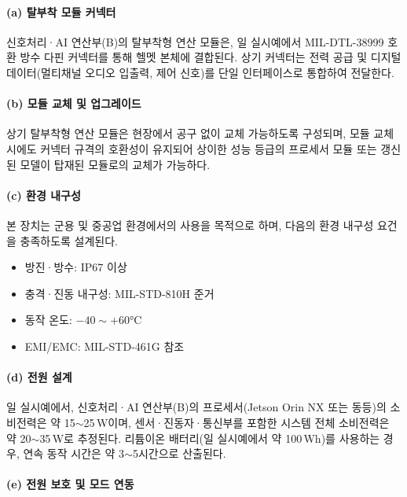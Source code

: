 \documentclass{article}
\begin{document}
\paragraph{(a) 탈부착 모듈 커넥터}

신호처리·AI 연산부(B)의 탈부착형 연산 모듈은, 일 실시예에서 MIL-DTL-38999 호환 방수 다핀 커넥터를 통해 헬멧 본체에 결합된다. 상기 커넥터는 전력 공급 및 디지털 데이터(멀티채널 오디오 입출력, 제어 신호)를 단일 인터페이스로 통합하여 전달한다.

\paragraph{(b) 모듈 교체 및 업그레이드}

상기 탈부착형 연산 모듈은 현장에서 공구 없이 교체 가능하도록 구성되며, 모듈 교체 시에도 커넥터 규격의 호환성이 유지되어 상이한 성능 등급의 프로세서 모듈 또는 갱신된 모델이 탑재된 모듈로의 교체가 가능하다.

\paragraph{(c) 환경 내구성}

본 장치는 군용 및 중공업 환경에서의 사용을 목적으로 하며, 다음의 환경 내구성 요건을 충족하도록 설계된다.

\begin{itemize}
    \item 방진·방수: IP67 이상
    \item 충격·진동 내구성: MIL-STD-810H 준거
    \item 동작 온도: $-40 \sim +60$°C
    \item EMI/EMC: MIL-STD-461G 참조
\end{itemize}

\paragraph{(d) 전원 설계}

일 실시예에서, 신호처리·AI 연산부(B)의 프로세서(Jetson Orin NX 또는 동등)의 소비전력은 약 15$\sim$25\,W이며, 센서·진동자·통신부를 포함한 시스템 전체 소비전력은 약 20$\sim$35\,W로 추정된다. 리튬이온 배터리(일 실시예에서 약 100\,Wh)를 사용하는 경우, 연속 동작 시간은 약 3$\sim$5시간으로 산출된다.

\paragraph{(e) 전원 보호 및 모드 연동}
\end{document}
